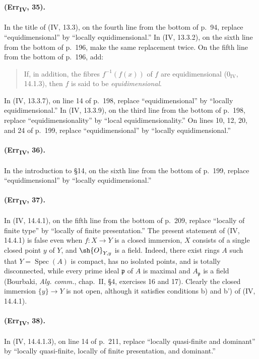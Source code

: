 {\paragraph{(Err\textsubscript{IV}, 35).}
In the title of (IV, 13.3), on the fourth line from the bottom of p.~94,
replace ``equidimensional'' by ``locally equidimensional.''  In
(IV, 13.3.2), on the sixth line from the bottom of p.~196, make the same
replacement twice.  On the fifth line from the bottom of p.~196, add:
\begin{quote}
If, in addition, the fibres $f^{-1}(f(x))$ of $f$ are equidimensional
($0_{\mathrm{IV}}$, 14.1.3), then $f$ is said to be
\emph{equidimensional}.
\end{quote}
In (IV, 13.3.7), on line 14 of p.~198, replace ``equidimensional'' by
``locally equidimensional.''  In (IV, 13.3.9), on the third line from
the bottom of p.~198, replace ``equidimensionality'' by ``local
equidimensionality.''  On lines 10, 12, 20, and 24 of p.~199, replace
``equidimensional'' by ``locally equidimensional.''

\paragraph{(Err\textsubscript{IV}, 36).}
In the introduction to \S14, on the sixth line from the bottom of
p.~199, replace ``equidimensional'' by ``locally equidimensional.''

\paragraph{(Err\textsubscript{IV}, 37).}
In (IV, 14.4.1), on the fifth line from the bottom of p.~209, replace
``locally of finite type'' by ``locally of finite presentation.''  The
present statement of (IV, 14.4.1) is false even when $f:X\to Y$ is a
closed immersion, $X$ consists of a single closed point $y$ of $Y$, and
$\sh{O}_{Y,y}$ is a field.  Indeed, there exist rings $A$ such that
$Y=\operatorname{Spec}(A)$ is compact, has no isolated points, and is
totally disconnected, while every prime ideal $\mathfrak p$ of $A$ is
maximal and $A_\mathfrak p$ is a field (Bourbaki,
\emph{Alg. comm.}, chap.~II, \S4, exercises 16 and 17).  Clearly the
closed immersion $\{y\}\to Y$ is not open, although it satisfies
conditions b) and b') of (IV, 14.4.1).

\paragraph{(Err\textsubscript{IV}, 38).}
In (IV, 14.4.1.3), on line 14 of p.~211, replace ``locally quasi-finite
and dominant'' by ``locally quasi-finite, locally of finite presentation,
and dominant.''

}
